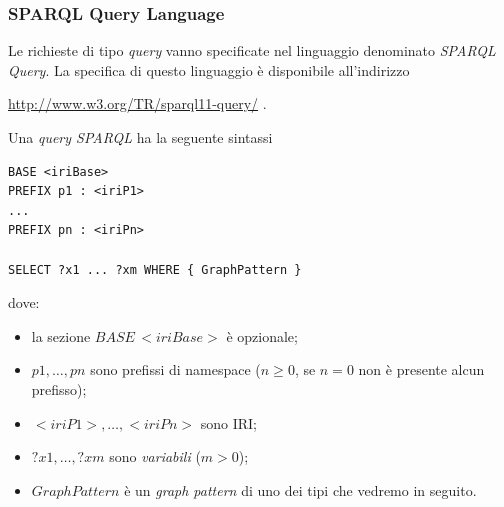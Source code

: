 \documentclass[8pt]{beamer}
\begin{document}
\begin{frame}[fragile]
\frametitle{SPARQL Query Language}
Le richieste di tipo \emph{query} vanno specificate nel linguaggio
denominato \emph{SPARQL Query}.
%
La specifica di questo linguaggio \`e disponibile all'indirizzo
\begin{center}
 \url{http://www.w3.org/TR/sparql11-query/} .
\end{center}

Una \emph{query SPARQL} ha la seguente sintassi
\begin{Verbatim}[fontsize=\small]
BASE <iriBase>
PREFIX p1 : <iriP1>
...
PREFIX pn : <iriPn>

SELECT ?x1 ... ?xm WHERE { GraphPattern }
\end{Verbatim}
dove: 
\begin{itemize}
 \item la sezione $BASE\,<iriBase>$ \`e opzionale;
 \item $p1, \ldots, pn$ sono prefissi di namespace ($n\geq0$, se $n=0$ non \`e presente alcun prefisso);
 \item $<iriP1>, \ldots, <iriPn>$ sono IRI;
 \item $?x1, \ldots, ?xm$ sono \emph{variabili} ($m>0$);
 \item $GraphPattern$ \`e un \emph{graph pattern} di uno dei tipi che vedremo in seguito.
\end{itemize}
\end{frame}
\end{document}
